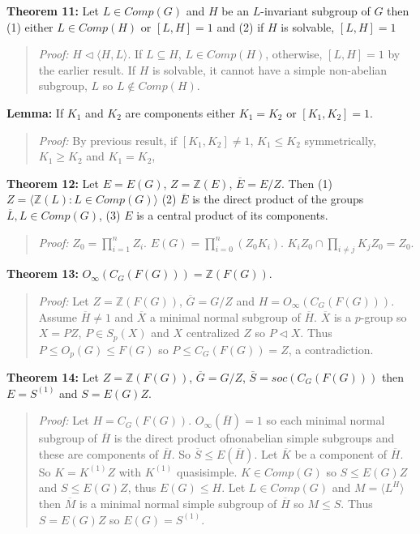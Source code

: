 {\bf Theorem 11:} Let $L \in Comp(G)$ and $H$ be an $L$-invariant subgroup of $G$ then
(1) either $L \in Comp(H)$ or $[L,H]=1$ and (2) if $H$ is solvable, $[L,H]=1$
\begin{quote}
\emph{Proof:}
$H \lhd \langle H, L \rangle$.  If $L \subseteq H$, $L \in Comp(H)$, otherwise,
$[L, H] = 1$ by the earlier result.  If $H$ is solvable, it cannot have a simple non-abelian subgroup, $L$ so $L \notin Comp(H)$.
\end{quote}
{\bf Lemma:} If $K_1$ and $K_2$ are components either $K_1= K_2$ or $[K_1, K_2 ] = 1$.
\begin{quote}
\emph{Proof:}
By previous result, if $[K_1 , K_2] \ne 1$, $K_1 \le K_2$ symmetrically,
$K_1 \ge K_2$ and $K_1 = K_2$,
\end{quote}
{\bf Theorem 12:} Let $E=E(G)$, $Z={\mathbb Z}(E)$, ${\overline E}= E/Z$.  Then
(1) $Z= \langle {\mathbb Z}(L): L \in Comp(G) \rangle $
(2) ${\overline E}$ is the direct product of the groups ${\overline L}, L \in Comp(G)$,
(3) $E$ is a central product of its components.
\begin{quote}
\emph{Proof:}
$Z_0 = \prod_{i=1}^n Z_i$.  $E(G)= \prod_{i=0}^n (Z_0 K_i)$.  $K_i Z_0 \cap \prod_{i \ne j} K_j Z_0 = Z_0$.
\end{quote}
{\bf Theorem 13:} $O_{\infty}(C_G(F(G)))= {\mathbb Z}(F(G))$.
\begin{quote}
\emph{Proof:}
Let $Z={\mathbb Z}(F(G))$, ${\overline G}= G/Z$ and $H=O_{\infty}(C_G(F(G)))$.
Assume ${\overline H} \ne 1$ and ${\overline X}$ a minimal normal subgroup of
${\overline H}$.  ${\overline X}$ is a $p$-group so $X=PZ$, $P \in S_p(X)$ and $X$
centralized $Z$ so $P \lhd X$.  Thus $P \le O_p(G) \le F(G)$ so $P \le C_G(F(G))=Z$,
a contradiction.
\end{quote}
{\bf Theorem 14:} Let $Z={\mathbb Z}(F(G))$, ${\overline G}= G/Z$, ${\overline S}= soc(C_G(F(G)))$
then $E= S^{(1)}$ and $S=E(G)Z$.
\begin{quote}
\emph{Proof:}
Let $H=C_G(F(G))$.  $O_{\infty}({\overline H}) = 1$ so each minimal normal subgroup
of ${\overline H}$ is the direct product ofnonabelian simple subgroups and these are
components of ${\overline H}$.  So ${\overline S} \le E({\overline H})$.
Let ${\overline K}$ be a component of ${\overline H}$.  So $K= K^{(1)}Z$ with
$K^{(1)}$ quasisimple.  $K \in Comp(G)$ so
$S \le E(G)Z$ and $S \le E(G)Z$, thus $E(G) \le H$.  Let $L \in Comp(G)$ and $M= \langle L^H \rangle $
then ${\overline M}$ is a minimal normal simple subgroup of ${\overline H}$ so
$M \le S$.  Thus $S=E(G)Z$ so $E(G)=S^{(1)}$.
\end{quote}
